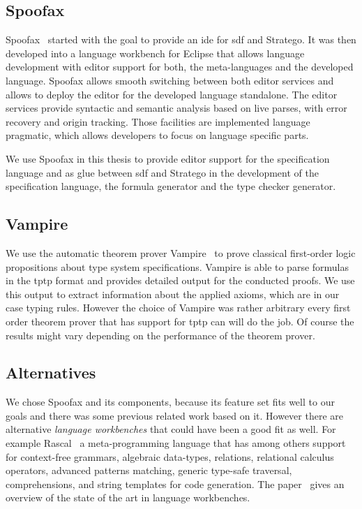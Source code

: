 \subsection{Spoofax}
Spoofax~\cite{KatsV10} started with the goal to provide an \gls{ide}
for \gls{sdf} and Stratego. It was then developed into a language
workbench for Eclipse that allows language development with editor
support for both, the meta-languages and the developed
language. Spoofax allows smooth switching between both editor services
and allows to deploy the editor for the developed language
standalone. The editor services provide syntactic and semantic
analysis based on live parses, with error recovery and origin
tracking. Those facilities are implemented language pragmatic, which
allows developers to focus on language specific parts.

We use Spoofax in this thesis to provide editor support for the
specification language and as glue between \gls{sdf} and Stratego in
the development of the specification language, the formula generator
and the type checker generator.

\subsection{Vampire}
We use the automatic theorem prover Vampire~\cite{VoronkovVampire} to
prove classical first-order logic propositions about type system
specifications. Vampire is able to parse formulas in the \gls{tptp}
format and provides detailed output for the conducted proofs. We use
this output to extract information about the applied axioms, which are
in our case typing rules. However the choice of Vampire was rather
arbitrary every first order theorem prover that has support for
\gls{tptp} can will do the job. Of course the results might vary
depending on the performance of the theorem prover.

\subsection{Alternatives}
We chose Spoofax and its components, because its feature set fits well
to our goals and there was some previous related work based on
it. However there are alternative \emph{language workbenches} that
could have been a good fit as well. For example
Rascal~\cite{klint2009rascal} a meta-programming language that has
among others support for context-free grammars, algebraic data-types,
relations, relational calculus operators, advanced patterns matching,
generic type-safe traversal, comprehensions, and string templates for
code generation. The paper~\cite{workbenches} gives an overview of the
state of the art in language workbenches.

